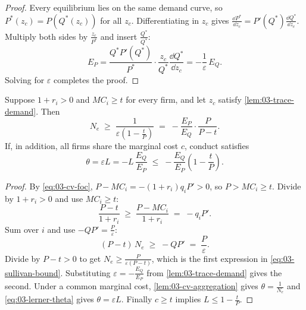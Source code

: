 \begin{proof}
Every equilibrium lies on the same demand curve, so $P^*(z_c) = P(Q^*(z_c))$ for all $z_c$. Differentiating
in $z_c$ gives $\frac{\dd P^*}{\dd z_c} = P'(Q^*)\frac{\dd Q^*}{\dd z_c}$. Multiply both sides by
$\frac{z_c}{P^*}$ and insert $\frac{Q^*}{Q^*}$:
\begin{equation*}
  E_P = \frac{Q^* P'(Q^*)}{P^*} \cdot \frac{z_c}{Q^*}\frac{\dd Q^*}{\dd z_c} = -\frac{1}{\varepsilon}\, E_Q .
\end{equation*}
Solving for $\varepsilon$ completes the proof.
\end{proof}

\begin{proposition}\label{prop:03-sullivan-bound}
Suppose $1 + r_i > 0$ and $MC_i \ge t$ for every firm, and let $z_c$ satisfy \cref{lem:03-trace-demand}. Then
\begin{equation}\label{eq:03-sullivan-bound}
  N_e \;\ge\; \frac{1}{\varepsilon\left(1 - \frac{t}{P}\right)} \;=\; -\frac{E_P}{E_Q}\cdot\frac{P}{P - t}.
\end{equation}
If, in addition, all firms share the marginal cost $c$, conduct satisfies
\begin{equation}\label{eq:03-sullivan-theta}
  \theta = \varepsilon L = -L\,\frac{E_Q}{E_P} \;\le\; -\frac{E_Q}{E_P}\left(1 - \frac{t}{P}\right).
\end{equation}
\end{proposition}

\begin{proof}
By \eqref{eq:03-cv-foc}, $P - MC_i = -(1 + r_i) q_i P' > 0$, so $P > MC_i \ge t$. Divide by $1 + r_i > 0$ and
use $MC_i \ge t$:
\begin{equation*}
  \frac{P - t}{1 + r_i} \;\ge\; \frac{P - MC_i}{1 + r_i} \;=\; -q_i P'.
\end{equation*}
Sum over $i$ and use $-QP' = \frac{P}{\varepsilon}$:
\begin{equation*}
  (P - t)\, N_e \;\ge\; -Q P' \;=\; \frac{P}{\varepsilon}.
\end{equation*}
Divide by $P - t > 0$ to get $N_e \ge \frac{P}{\varepsilon (P - t)}$, which is the first expression in
\eqref{eq:03-sullivan-bound}. Substituting $\varepsilon = -\frac{E_Q}{E_P}$ from \cref{lem:03-trace-demand}
gives the second. Under a common marginal cost, \cref{lem:03-cv-aggregation} gives $\theta = \frac{1}{N_e}$
and \eqref{eq:03-lerner-theta} gives $\theta = \varepsilon L$. Finally $c \ge t$ implies $L \le 1 -
\frac{t}{P}$.
\end{proof}

